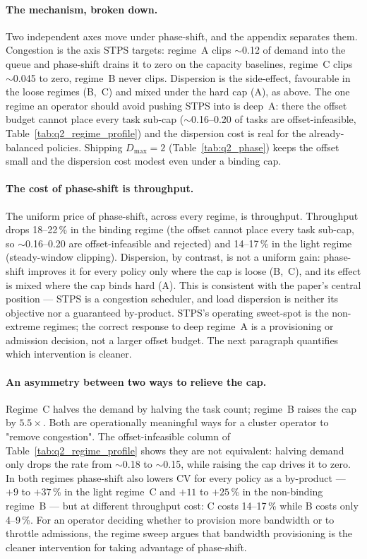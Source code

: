 \documentclass[letterpaper,twocolumn,10pt]{article}
\begin{document}
\paragraph{The mechanism, broken down.} Two independent axes move under phase-shift, and the appendix separates them. Congestion is the axis STPS targets: regime~A clips $\sim$0.12 of demand into the queue and phase-shift drains it to zero on the capacity baselines, regime~C clips $\sim$0.045 to zero, regime~B never clips. Dispersion is the side-effect, favourable in the loose regimes (B,~C) and mixed under the hard cap (A), as above. The one regime an operator should avoid pushing STPS into is deep~A: there the offset budget cannot place every task sub-cap ($\sim$0.16--0.20 of tasks are offset-infeasible, Table~\ref{tab:q2_regime_profile}) and the dispersion cost is real for the already-balanced policies. Shipping $D_{\max}\!=\!2$ (Table~\ref{tab:q2_phase}) keeps the offset small and the dispersion cost modest even under a binding cap.

\paragraph{The cost of phase-shift is throughput.} The uniform price of phase-shift, across every regime, is throughput. Throughput drops 18--22\,\% in the binding regime (the offset cannot place every task sub-cap, so $\sim$0.16--0.20 are offset-infeasible and rejected) and 14--17\,\% in the light regime (steady-window clipping). Dispersion, by contrast, is not a uniform gain: phase-shift improves it for every policy only where the cap is loose (B,~C), and its effect is mixed where the cap binds hard (A). This is consistent with the paper's central position --- STPS is a congestion scheduler, and load dispersion is neither its objective nor a guaranteed by-product. STPS's operating sweet-spot is the non-extreme regimes; the correct response to deep regime~A is a provisioning or admission decision, not a larger offset budget. The next paragraph quantifies which intervention is cleaner.

\paragraph{An asymmetry between two ways to relieve the cap.} Regime~C halves the demand by halving the task count; regime~B raises the cap by $5.5\!\times$. Both are operationally meaningful ways for a cluster operator to "remove congestion". The offset-infeasible column of Table~\ref{tab:q2_regime_profile} shows they are not equivalent: halving demand only drops the rate from $\sim$0.18 to $\sim$0.15, while raising the cap drives it to zero. In both regimes phase-shift also lowers CV for every policy as a by-product --- $+9$ to $+37$\,\% in the light regime~C and $+11$ to $+25$\,\% in the non-binding regime~B --- but at different throughput cost: C costs 14--17\,\% while B costs only 4--9\,\%. For an operator deciding whether to provision more bandwidth or to throttle admissions, the regime sweep argues that bandwidth provisioning is the cleaner intervention for taking advantage of phase-shift.




\end{document}
